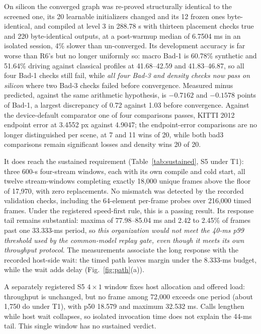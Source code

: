 \documentclass[sigconf,review,anonymous]{acmart}
\begin{document}
On silicon the converged graph was re-proved structurally identical to the screened one, its 20 learnable initializers changed and its 12 frozen ones byte-identical, and compiled at level 3 in 288.78 s with thirteen placement checks true and 220 byte-identical outputs, at a post-warmup median of 6.7504 ms in an isolated session, 4\% slower than un-converged. Its development accuracy is far worse than R6's but no longer uniformly so: macro Bad-1 is 60.78\% synthetic and 51.64\% driving against classical profiles at 41.68--42.59 and 41.83--46.87, so all four Bad-1 checks still fail, while \emph{all four Bad-3 and density checks now pass on silicon} where two Bad-3 checks failed before convergence. Measured minus predicted, against the same arithmetic hypothesis, is $-0.7162$ and $-0.1578$ points of Bad-1, a largest discrepancy of 0.72 against 1.03 before convergence. Against the device-default comparator one of four comparisons passes, KITTI 2012 endpoint error at 3.4552 px against 4.9047; the endpoint-error comparisons are no longer distinguished per scene, at 7 and 11 wins of 20, while both bad3 comparisons remain significant losses and density wins 20 of 20.

It does reach the sustained requirement (Table~\ref{tab:sustained}, S5 under T1): three 600-s four-stream windows, each with its own compile and cold start, all twelve stream-windows completing exactly 18,000 unique frames above the floor of 17,970, with zero replacements. No mismatch was detected by the recorded validation checks, including the 64-element per-frame probes over 216,000 timed frames. Under the registered speed-first rule, this is a passing result. Its response tail remains substantial: maxima of 77.98--85.04 ms and 2.42 to 2.45\% of frames past one 33.333-ms period, so \emph{this organization would not meet the 40-ms p99 threshold used by the common-model replay gate, even though it meets its own throughput protocol}. The measurements associate the long response with the recorded host-side wait: the timed path leaves margin under the 8.333-ms budget, while the wait adds delay (Fig.~\ref{fig:path}(a)).

A separately registered S5 $4\times1$ window fixes host allocation and offered load: throughput is unchanged, but no frame among 72,000 exceeds one period (about 1,750 do under T1), with p50 18.579 and maximum 32.532 ms. Calls lengthen while host wait collapses, so isolated invocation time does not explain the 44-ms tail. This single window has no sustained verdict.
\end{document}
